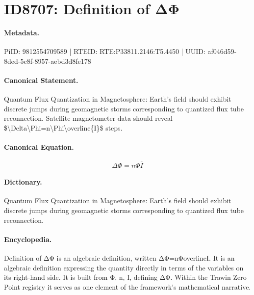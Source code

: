 \section*{ID8707: Definition of ΔΦ}
\paragraph{Metadata.}
PiID: 9812554709589 | RTEID: RTE:P33811.2146:T5.4450 | UUID: af046d59-8ded-5c8f-8957-aebd3d8fe178

\paragraph{Canonical Statement.}
Quantum Flux Quantization in Magnetosphere: Earth's field should exhibit discrete jumps during geomagnetic storms corresponding to quantized flux tube reconnection. Satellite magnetometer data should reveal \$\textbackslash{}Delta\textbackslash{}Phi=n\textbackslash{}Phi\textbackslash{}overline\{I\}\$ steps.

\paragraph{Canonical Equation.}
\[
\Delta\Phi=n\Phi\overline{I}
\]

\paragraph{Dictionary.}
Quantum Flux Quantization in Magnetosphere: Earth's field should exhibit discrete jumps during geomagnetic storms corresponding to quantized flux tube reconnection.

\paragraph{Encyclopedia.}
Definition of ΔΦ is an algebraic definition, written ΔΦ=nΦoverlineI. It is an algebraic definition expressing the quantity directly in terms of the variables on its right-hand side. It is built from Φ, n, I, defining ΔΦ. Within the Trawin Zero Point registry it serves as one element of the framework's mathematical narrative.
